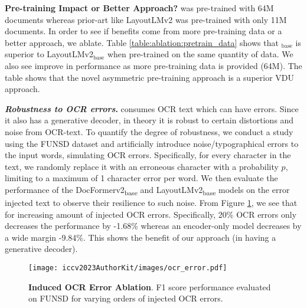 \documentclass[10pt,twocolumn,letterpaper]{article}
\begin{document}
 \vspace{-3mm}
\noindent \textbf{Pre-training Impact or Better Approach?} \papertitleshort was pre-trained with 64M documents whereas prior-art 
like LayoutLMv2 \cite{xu2020layoutlmv2} 
was pre-trained with only 11M documents.
In order to see if \papertitleshort benefits come from more pre-training data or a better approach, we ablate. Table \ref{table:ablation:pretrain_data} shows that \papertitleshort$_{\text{base}}$ is superior to LayoutLMv2$_{\text{base}}$ when pre-trained on the same quantity of data. We also see \papertitleshort improve in performance as more pre-training data is provided (64M). The table shows that the novel \papertitleshort asymmetric pre-training approach is a superior VDU approach.





\noindent \textbf{\textit{Robustness to OCR errors}.} \papertitleshort consumes OCR text which can have errors. Since it also has a generative decoder, in theory it is robust to certain distortions and noise from OCR-text. To quantify the degree of robustness, we conduct a study using the FUNSD dataset and artificially introduce noise/typographical errors to the input words, simulating OCR errors. Specifically, for every character in the text, we randomly replace it with an erroneous character with a probability $p$, limiting to a maximum of 1 character error per word. We then evaluate the performance of the DocFormerv2\textsubscript{base} and LayoutLMv2\textsubscript{base} models on the error injected text to observe their resilience to such noise. From Figure \ref{fig:ocrerror}, we see that for increasing amount of injected OCR errors. Specifically, 20\% OCR errors only decreases the performance by -1.68\% whereas an encoder-only model decreases by a wide margin -9.84\%. This shows the benefit of our approach (in having a generative decoder).




\vspace{-5mm}
\begin{figure}[!h]
  \centering
  \texttt{[image: iccv2023AuthorKit/images/ocr\_error.pdf]}
  \caption{\textbf{Induced OCR Error Ablation}. F1 score performance evaluated on FUNSD for varying orders of injected OCR errors.
  }
  \label{fig:ocrerror}
  \vspace{-3mm}
\end{figure}
\end{document}
